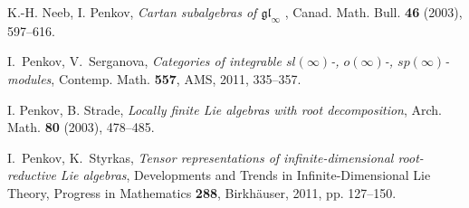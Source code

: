 \documentclass{amsart}
\theoremstyle{definition}
\numberwithin{equation}{section}
\begin{document}
\begin{thebibliography}{}
K.-H. Neeb, I. Penkov, \textit{Cartan subalgebras of $\mathfrak{gl}_\infty$ }, Canad. Math. Bull. \textbf{46} (2003), 597--616.

I.~Penkov, V.~Serganova, \textit{Categories of integrable
  $sl(\infty)$-, $o(\infty)$-, $sp(\infty)$-modules}, Contemp.
Math. \textbf{557}, AMS, 2011, 335--357.

I. Penkov, B. Strade, \textit{Locally finite Lie algebras with root decomposition}, Arch. Math. \textbf{80} (2003), 478--485.

I.~Penkov, K.~Styrkas, \textit{Tensor representations of infinite-dimensional root-reductive Lie algebras}, Developments and Trends in Infinite-Dimensional Lie Theory, Progress in Mathematics \textbf{288}, Birkh\"auser, 2011, pp. 127--150.


\end{thebibliography}
\end{document}
